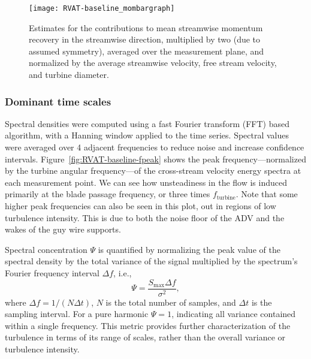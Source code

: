 \begin{figure}
    \centering

    \texttt{[image: RVAT-baseline\_mombargraph]}

    \caption{Estimates for the contributions to mean streamwise momentum
        recovery in the streamwise direction, multiplied by two (due to assumed
        symmetry), averaged over the measurement plane, and normalized by the
        average streamwise velocity, free stream velocity, and turbine diameter.}

    \label{fig:mombargraph}
\end{figure}


\subsubsection{Dominant time scales}

Spectral densities were computed using a fast Fourier transform (FFT) based
algorithm, with a Hanning window applied to the time series. Spectral values
were averaged over 4 adjacent frequencies to reduce noise and increase
confidence intervals. Figure~\ref{fig:RVAT-baseline-fpeak} shows the peak
frequency---normalized by the turbine angular frequency---of the cross-stream
velocity energy spectra at each measurement point. We can see how unsteadiness
in the flow is induced primarily at the blade passage frequency, or three times
$f_\mathrm{turbine}$. Note that some higher peak frequencies can also be seen in
this plot, out in regions of low turbulence intensity. This is due to both the
noise floor of the ADV and the wakes of the guy wire supports.

Spectral concentration $\Psi$ is quantified by normalizing the peak value of the
spectral density by the total variance of the signal multiplied by the
spectrum's Fourier frequency interval $\Delta f$, i.e.,
\begin{equation}
    \Psi = \frac{S_{\max} \Delta f}{\sigma^2},
    \label{eq:spectral-concentration}
\end{equation}
where $\Delta f = 1/(N \Delta t)$, $N$ is the total number of samples, and
$\Delta t$ is the sampling interval. For a pure harmonic $\Psi = 1$, indicating
all variance contained within a single frequency. This metric provides further
characterization of the turbulence in terms of its range of scales, rather than
the overall variance or turbulence intensity.

